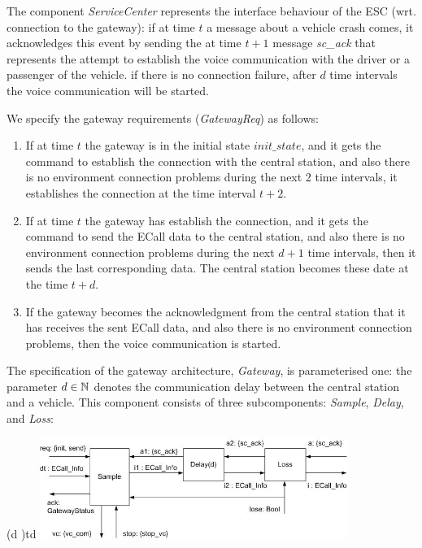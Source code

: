 The component \emph{ServiceCenter} represents the interface behaviour of the ESC 
(wrt. connection to the gateway): 
if at time $t$ a message about a vehicle crash comes, it acknowledges this event by sending 
the at time $t+1$ message \emph{sc\_ack} that represents the 
attempt to establish the voice communication with the driver or a passenger of the vehicle. 
if there is no connection failure, after $d$ time intervals the voice communication will be started. 

We specify the gateway requirements (\emph{GatewayReq}) as follows: 
	\begin{enumerate}
	\item 
	If at time $t$ the gateway is in the initial state $init\_state$, and it gets 
	the command to establish the connection with the central station, and also there is no 
	environment connection problems during the next 2 time intervals, 
	it establishes the connection at the time interval $t+2$. 
	\item 
	If at time $t$  the gateway has establish the connection, 
	and it gets the command to send the ECall data to the central station, and also there is no 
	environment connection problems during the next $d+1$ time intervals, 
	then it sends the last corresponding data. 
        The central station becomes these date at the time $t+d$.
	\item 
	If the gateway becomes the acknowledgment from the central station 
	that it has receives the sent ECall data, and also there is no 
	environment connection problems, then the voice communication is started.
  \end{enumerate}
 The specification of the gateway architecture, \emph{Gateway}, is parameterised one: 
the parameter $d \in {\mathbb N}$ denotes the communication delay 
between the central station and a vehicle. 
This component consists of three subcomponents: \emph{Sample}, \emph{Delay}, 
and \emph{Loss}: 
 
\begin{spec}{(\nconst d \in \Nat)}{td}
\centering \includegraphics[width=10cm]{fig/gateway.jpg}
\end{spec} 
  
